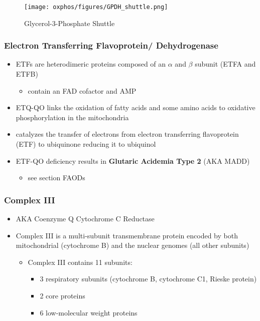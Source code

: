 \documentclass[12pt]{scrartcl}
\begin{document}
\begin{figure}[htbp]
\centering
\texttt{[image: oxphos/figures/GPDH\_shuttle.png]}
\caption[g3ps]{\label{fig:org7f4a041}Glycerol-3-Phosphate Shuttle}
\end{figure}

\subsubsection{Electron Transferring Flavoprotein/ Dehydrogenase}
\label{sec:org45f2c6b}
\begin{itemize}
\item ETFs are heterodimeric proteins composed of an \(\alpha\) and \(\beta\)
subunit (ETFA and ETFB)
\begin{itemize}
\item contain an FAD cofactor and AMP
\end{itemize}
\item ETQ-QO links the oxidation of fatty acids and some amino acids to
oxidative phosphorylation in the mitochondria
\item catalyzes the transfer of electrons from electron transferring
flavoprotein (ETF) to ubiquinone reducing it to ubiquinol
\end{itemize}

{\small{}}

\begin{itemize}
\item ETF-QO deficiency results in \textbf{Glutaric Acidemia Type 2} (AKA MADD)
\begin{itemize}
\item see section FAODs
\end{itemize}
\end{itemize}
\subsubsection{Complex III}
\label{sec:orgd27df15}
\begin{itemize}
\item AKA Coenzyme Q Cytochrome C Reductase
\item Complex III is a multi-subunit transmembrane protein encoded by both
mitochondrial (cytochrome B) and the nuclear genomes (all other
subunits)

\begin{itemize}
\item Complex III contains 11 subunits:
\begin{itemize}
\item 3 respiratory subunits (cytochrome B, cytochrome C1, Rieske protein)
\item 2 core proteins
\item 6 low-molecular weight proteins
\end{itemize}
\end{itemize}

{\small{}}
\end{itemize}
\end{document}
